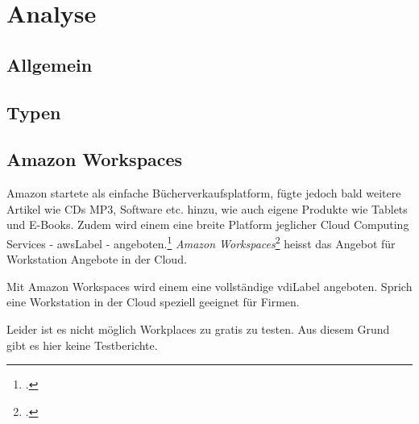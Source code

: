 

\chapter{Analyse}

\section{Allgemein}

\section{Typen}

\section{Amazon Workspaces}

Amazon startete als einfache Bücherverkaufsplatform, fügte jedoch bald weitere Artikel wie CDs MP3, Software etc. hinzu, wie auch eigene Produkte wie Tablets und E-Books.
Zudem wird einem eine breite Platform jeglicher Cloud Computing Services - \Gls{awsLabel} - angeboten.\footcite{Amazon.com_-_Wikipedia_the_free_encyclopedia_2014-11-15}
\textit{Amazon Workspaces}\footcite{AWS_Amazon_WorkSpaces_2014-11-03} heisst das Angebot für Workstation Angebote in der Cloud.

Mit Amazon Workspaces wird einem eine vollständige \Gls{vdiLabel} angeboten. Sprich eine Workstation in der Cloud speziell geeignet für Firmen.

Leider ist es nicht möglich Workplaces zu gratis zu testen. Aus diesem Grund gibt es hier keine Testberichte.

